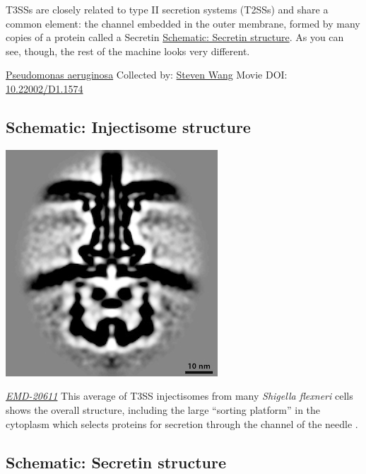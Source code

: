 \documentclass[]{tufte-book}
\begin{document}
T3SSs are closely related to type II secretion systems (T2SSs) and share a common element: the channel embedded in the outer membrane, formed by many copies of a protein called a Secretin \protect\hyperlink{Secretin_structure}{Schematic: Secretin structure}. As you can see, though, the rest of the machine looks very different.



\hypertarget{htmlwidget-0fa0385eaa89171367ea}{}

\label{fig:9-4}\protect\hyperlink{tree}{Pseudomonas aeruginosa} Collected by: \protect\hyperlink{steven_wang}{Steven Wang} Movie DOI: \href{https://doi.org/10.22002/D1.1574}{10.22002/D1.1574}

\hypertarget{Injectisome_structure}{%
\subsection*{Schematic: Injectisome structure}\label{Injectisome_structure}}

\includegraphics{img/schematics/9_4_1}

\href{https://www.ebi.ac.uk/pdbe/entry/emdb/EMD-20611}{\emph{EMD-20611}}
This average of T3SS injectisomes from many \emph{Shigella flexneri} cells shows the overall structure, including the large ``sorting platform'' in the cytoplasm which selects proteins for secretion through the channel of the needle \citep{tachiyama2019}.

\hypertarget{Secretin_structure}{%
\subsection*{Schematic: Secretin structure}\label{Secretin_structure}}
\end{document}
